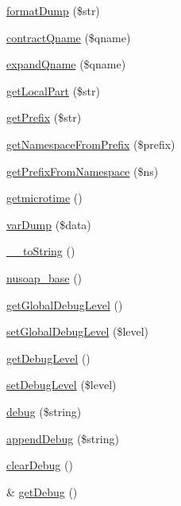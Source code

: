 \begin{DoxyCompactItemize}
\item 
\hyperlink{classnusoap__base_a25b092fe846b5b64eb91f3e69c0135d7}{format\+Dump} (\$str)
\item 
\hyperlink{classnusoap__base_a80d8fbb13c77aa2c9f55412d3ec42b35}{contract\+Qname} (\$qname)
\item 
\hyperlink{classnusoap__base_a4ae2088629a518bce1dcd587493ba1c5}{expand\+Qname} (\$qname)
\item 
\hyperlink{classnusoap__base_ad8a635f36c991a56a1f922bbb4f4b926}{get\+Local\+Part} (\$str)
\item 
\hyperlink{classnusoap__base_a4065364adef252b0f97ae746c4ad04bf}{get\+Prefix} (\$str)
\item 
\hyperlink{classnusoap__base_ac1674cfdd84b7c057f567b5a412765ca}{get\+Namespace\+From\+Prefix} (\$prefix)
\item 
\hyperlink{classnusoap__base_ac61943e23235475161427270581a0b32}{get\+Prefix\+From\+Namespace} (\$ns)
\item 
\hyperlink{classnusoap__base_acdd881f58961544f44bfe96ad57f1299}{getmicrotime} ()
\item 
\hyperlink{classnusoap__base_a072b06434688ac7c909f822ddbb48535}{var\+Dump} (\$data)
\item 
\hyperlink{classnusoap__base_a7516ca30af0db3cdbf9a7739b48ce91d}{\+\_\+\+\_\+to\+String} ()
\item 
\hyperlink{classnusoap__base_a07443354955c9c613494da2c352f8c6e}{nusoap\+\_\+base} ()
\item 
\hyperlink{classnusoap__base_ace64a2a947aa8b2e41b59676eb3b2c04}{get\+Global\+Debug\+Level} ()
\item 
\hyperlink{classnusoap__base_a11ccf93dc5a46058da219a8dc2a826f1}{set\+Global\+Debug\+Level} (\$level)
\item 
\hyperlink{classnusoap__base_a122db96cedfc221cf187ce4328f992f7}{get\+Debug\+Level} ()
\item 
\hyperlink{classnusoap__base_a5254eafb0d4b255e290f98b186a7036d}{set\+Debug\+Level} (\$level)
\item 
\hyperlink{classnusoap__base_ac652bd9010bd39b0f2854f7ded3f6f33}{debug} (\$string)
\item 
\hyperlink{classnusoap__base_a659455287a25d64cd0bcb0c04ec9d62d}{append\+Debug} (\$string)
\item 
\hyperlink{classnusoap__base_a5b44893b1d018eee5868a29ef790b97a}{clear\+Debug} ()
\item 
\& \hyperlink{classnusoap__base_a4b229e854137bd6ffae366eac8374623}{get\+Debug} ()
\item 

\end{DoxyCompactItemize}
